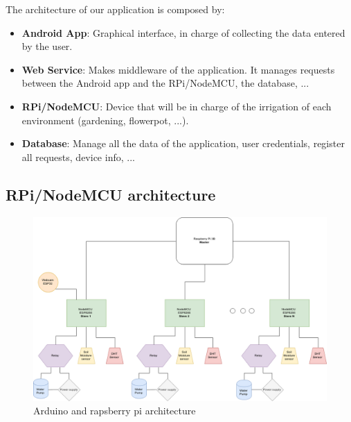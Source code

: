 \documentclass[11pt,a4paper]{article}
\begin{document}
The architecture of our application is composed by:
\begin{itemize}
\item \textbf{Android App}: Graphical interface, in charge of collecting the data entered by the user.
\item \textbf{Web Service}: Makes middleware of the application. It manages requests between the Android app and the RPi/NodeMCU, the database, ...
\item \textbf{RPi/NodeMCU}: Device that will be in charge of the irrigation of each environment (gardening, flowerpot, ...).
\item \textbf{Database}: Manage all the data of the application, user credentials, register all requests, device info, ...
\end{itemize}

\newpage

\subsection{RPi/NodeMCU architecture}
\begin{figure}[hbtp]
\centering
\includegraphics[scale=0.4]{figures/IrrigationSystem.png}
\caption{Arduino and rapsberry pi architecture}
\end{figure}
\end{document}
